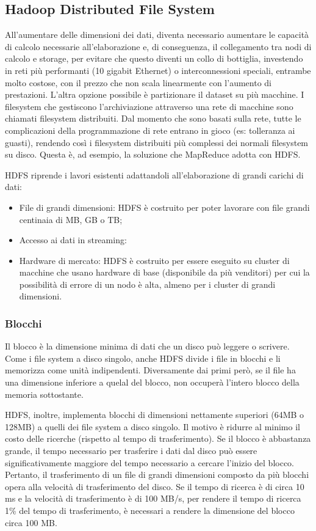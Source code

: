 \documentclass{article}
\begin{document}
\subsection{Hadoop Distributed File System}
All'aumentare delle dimensioni dei dati, diventa necessario aumentare le capacità di calcolo necessarie all'elaborazione e, di conseguenza, il collegamento tra nodi di calcolo e storage, per evitare che questo diventi un collo di bottiglia, investendo in reti più performanti (10 gigabit Ethernet) o interconnessioni speciali, entrambe molto costose, con il prezzo che non scala linearmente con l'aumento di prestazioni. L'altra opzione possibile è partizionare il dataset su più macchine. I filesystem che gestiscono l'archiviazione attraverso una rete di macchine sono chiamati filesystem distribuiti. Dal momento che sono basati sulla rete, tutte le complicazioni della programmazione di rete entrano in gioco (es: tolleranza ai guasti), rendendo così i filesystem distribuiti più complessi dei normali filesystem su disco. Questa è, ad esempio, la soluzione che MapReduce adotta con HDFS. 

HDFS riprende i lavori esistenti adattandoli all'elaborazione di grandi carichi di dati:
\begin{itemize}
    \item File di grandi dimensioni: HDFS è costruito per poter lavorare con file grandi centinaia di MB, GB o TB;
    \item Accesso ai dati in streaming: 
    \item Hardware di mercato: HDFS è costruito per essere eseguito su cluster di macchine che usano hardware di base (disponibile da più venditori) per cui la possibilità di errore di un nodo è alta, almeno per i cluster di grandi dimensioni.
\end{itemize}

\subsubsection{Blocchi}

Il blocco è la dimensione minima di dati che un disco può leggere o scrivere. Come i file system a disco singolo, anche HDFS divide i file in blocchi e li memorizza come unità indipendenti. Diversamente dai primi però, se il file ha una dimensione inferiore a quelal del blocco, non occuperà l'intero blocco della memoria sottostante. 

HDFS, inoltre, implementa blocchi di dimensioni nettamente superiori (64MB o 128MB) a quelli dei file system a disco singolo. Il motivo è ridurre al minimo il costo delle ricerche (rispetto al tempo di trasferimento). Se il blocco è abbastanza grande, il tempo necessario per trasferire i dati dal disco può essere significativamente maggiore del tempo necessario a cercare l'inizio del blocco. Pertanto, il trasferimento di un file di grandi dimensioni composto da più blocchi opera alla velocità di trasferimento del disco. Se il tempo di ricerca è di circa 10 ms e la velocità di trasferimento è di 100 MB/s, per rendere il tempo di ricerca 1\% del tempo di trasferimento, è necessari a rendere la dimensione del blocco circa 100 MB.
\end{document}
